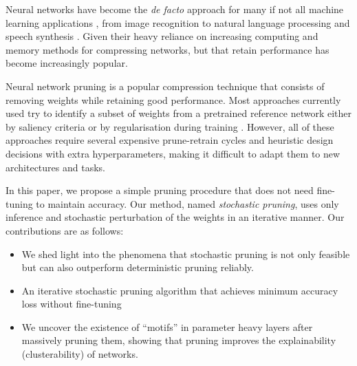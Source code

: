 
    Neural networks have become the \textit{de facto} approach for many if not
    all machine learning applications \cite{lecunDeepLearning2015}, from  image
    recognition \cite{dengImageNetLargescaleHierarchical2009} to natural language
    processing \cite{devlinBERTPretrainingDeep2019} and  
    speech synthesis \cite{oordWaveNetGenerativeModel2016}.
    Given their heavy reliance on increasing computing and memory
    \cite{brownLanguageModelsAre2020,thompsonComputationalLimitsDeep2020}
    methods for compressing networks, but that retain performance has become
    increasingly popular.

Neural network pruning is a popular compression technique that consists of removing weights while retaining good performance.
Most approaches currently used try to identify a subset of weights from a
pretrained reference network either by saliency criteria
\cite{mozerSkeletonizationTechniqueTrimming1988,
hassibiSecondOrderDerivatives1992,lecunOptimalBrainDamage1989} or by
regularisation during training
\cite{chauvinBackPropagationAlgorithmOptimal1988,
carreira-perpinanLearningCompressionAlgorithmsNeural2018}. However, all of these approaches require several expensive prune-retrain cycles and heuristic
design decisions with extra hyperparameters, making it difficult to adapt them
to new architectures and tasks.

In this paper, we propose a simple pruning procedure that does not need
fine-tuning to maintain accuracy. Our method, named \textit{stochastic
pruning}, uses only inference and stochastic perturbation of the weights in an
iterative manner.
Our contributions are as follows:
     \begin{itemize}
         \item We shed light into the phenomena that stochastic pruning is not
             only feasible but can also outperform deterministic pruning
             reliably.
        \item An iterative stochastic pruning algorithm that achieves minimum
            accuracy loss without fine-tuning

        \item We uncover the existence of ``motifs'' in parameter heavy
                layers after massively pruning them, showing that pruning
                improves the explainability (clusterability) of
                networks.

     \end{itemize}
     
